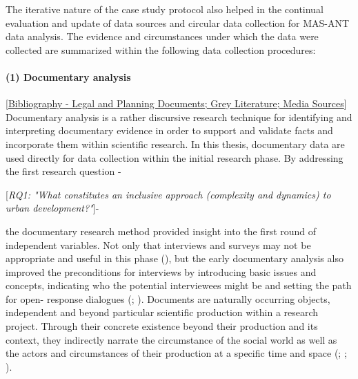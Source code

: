 \documentclass[11pt]{report}
\begin{document}
The iterative nature of the case study protocol also helped in the continual evaluation and update of data sources and circular data collection for MAS-ANT data analysis. The evidence and circumstances under which the data were collected are summarized within the following data collection procedures: 

\paragraph{(1) Documentary analysis} 
[\href{Bibliography}{Bibliography - Legal and Planning Documents; Grey Literature; Media Sources}]
\\

Documentary analysis is a rather discursive research technique for identifying and interpreting documentary evidence in order to support and validate facts and incorporate them within scientific research. In this thesis, documentary data are used directly for data collection within the initial research phase. By addressing the first research question -

[\textit{RQ1: "What constitutes an inclusive approach (complexity and dynamics) to urban development?"}]-

the documentary research method provided insight into the first round of independent variables.
Not only that interviews and surveys may not be appropriate and useful in this phase (\href{Mogalakwe}{\citealt{mogalakwe_use_2006}}), but the early documentary analysis also improved the preconditions for interviews by introducing basic issues and concepts, indicating who the potential interviewees might be and setting the path for open- response dialogues (\href{Robson}{\citealt{robson_real_1993}}; \href{Grubovic}{\citealt{grubovic_belgrade_2006}}).
Documents are naturally occurring objects, independent and beyond particular scientific production within a research project. Through their concrete existence beyond their production and its context, they indirectly narrate the circumstance of the social world as well as the actors and circumstances of their production at a specific time and space (\href{Jary}{\citealt{jary_harpercollins_1991}}; \href{Payne}{\citealt{payne_key_2004}}; \href{Mogalakwe}{\citealt{mogalakwe_use_2006}}).
\\
\end{document}
